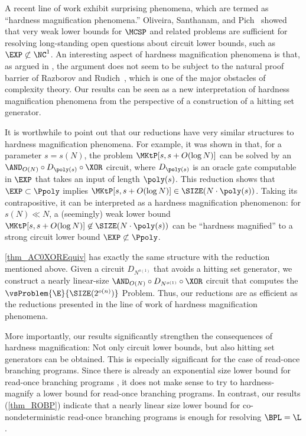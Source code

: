 \documentclass[11pt]{article}
\numberwithin{equation}{section}
\theoremstyle{definition}
\theoremstyle{plain}
\begin{document}
A recent line of work \cite{OliveiraS18_focs_conf, OliveiraPS19_coco_conf, McKayMW19_stoc_conf, ChenJW19_focs_conf, ChenHOPRS20_innovations_conf} exhibit surprising phenomena, which are termed as ``hardness magnification phenomena.''
Oliveira, Santhanam, and Pich~\cite{OliveiraS18_focs_conf,OliveiraPS19_coco_conf}
showed that
very weak lower bounds for $\MCSP$ and related problems
are sufficient for resolving
long-standing open questions
about circuit lower bounds, such as $\EXP \not\subset \NC^1$.
An interesting aspect of hardness magnification phenomena is that,
as argued in \cite{AllenderK10_jacm_journals, OliveiraS18_focs_conf},
the argument does not seem to be subject to the natural proof barrier of Razborov and Rudich~\cite{RazborovR97_jcss_journals},
which is one of the major obstacles of complexity theory.
Our results can be seen as a new interpretation of hardness magnification phenomena
from the perspective of
a construction of a hitting set generator.

It is worthwhile to point out that our reductions have very similar structures
to hardness magnification phenomena.
For example, it was shown in \cite{OliveiraS18_focs_conf, OliveiraPS19_coco_conf} that, for a parameter $s = s(N)$,
the problem $\MKtP[s, s + O(\log N)]$
can be solved by
an $\AND_{O(N)} \circ D_{\poly(s)} \circ \XOR$ circuit,
where $D_{\poly(s)}$ is an oracle gate computable in $\EXP$ that takes an input of length $\poly(s)$.
This reduction shows that
$\EXP \subset \Ppoly$ implies $\MKtP[s, s + O(\log N)] \in \SIZE(N \cdot \poly(s))$.
Taking its contrapositive,
it can be interpreted as a hardness magnification phenomenon:
for $s(N) \ll N$, a (seemingly) weak lower bound $\MKtP[s, s + O(\log N)] \not\in \SIZE(N \cdot \poly(s))$
can be ``hardness magnified'' to
a strong circuit lower bound $\EXP \not\subset \Ppoly$.

\cref{thm_AC0XOREquiv} has exactly the same structure with the reduction mentioned above.
Given a circuit $D_{N^{o(1)}}$ that avoids a hitting set generator,
we construct a nearly linear-size $\AND_{O(N)} \circ D_{N^{o(1)}} \circ \XOR$ circuit that computes
the $\vsProblem{\E}{\SIZE(2^{o(n)})}$ Problem.
Thus, our reductions are as efficient as the reductions presented
in the line of work of hardness magnification phenomena.

More importantly, our results significantly strengthen the consequences of hardness magnification:
Not only circuit lower bounds, but also hitting set generators can be obtained.
This is especially significant for the case of read-once branching programs.
Since
there is already an exponential size lower bound
for read-once branching programs \cite{BorodinRS93_cc_journals},
it does not make sense to try to hardness-magnify
a lower bound for read-once branching programs.
In contrast,
our results (\cref{thm_ROBP})
indicate that
a nearly linear size lower bound for co-nondeterministic read-once branching programs
is enough for resolving $\BPL = \L$.
\end{document}
